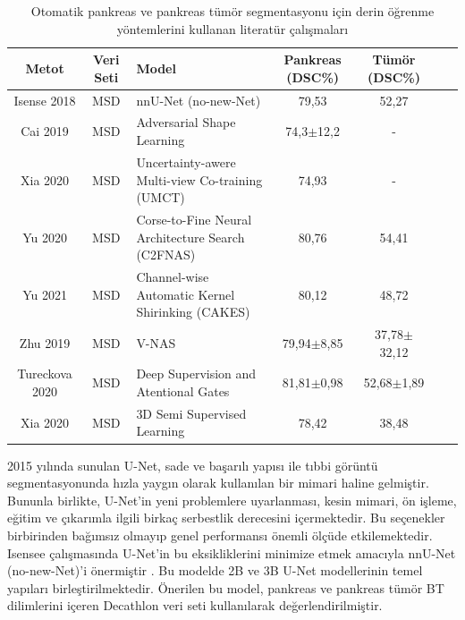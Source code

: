 \begin{table}[h!]
	\centering
	\caption{Otomatik pankreas ve pankreas tümör segmentasyonu için derin öğrenme yöntemlerini kullanan literatür çalışmaları}
	\label{tab:lit2}
	\begin{adjustbox}{width=\textwidth}
	\begin{tabular}{ccm{5cm}cccc}
		\toprule
		Metot                           &  Veri Seti   &  Model  & Pankreas (DSC\%)  & Tümör (DSC\%) \\ 
		\midrule 
		Isense 2018 \cite{isensee2018nnu}  &  MSD    &  nnU-Net (no-new-Net)  & 79,53 & 52,27  \\ 
		Cai 2019 \cite{cai2019end}  &  MSD   &  Adversarial Shape Learning & 74,3$\pm$12,2 & - \\
		Xia 2020 \cite{xia2020uncertainty}    &  MSD    &  Uncertainty-awere Multi-view Co-training (UMCT)   & 74,93 & - \\
		Yu 2020 \cite{yu2020c2fnas}    &  MSD    & Corse-to-Fine Neural Architecture Search (C2FNAS)   & 80,76 & 54,41\\
		Yu 2021 \cite{yu2020cakes}    &  MSD    & Channel-wise Automatic Kernel Shirinking (CAKES) & 80,12 & 48,72\\
		Zhu 2019 \cite{zhu2019v}     &  MSD    &  V-NAS & 79,94$\pm$8,85 & 37,78$\pm$32,12 \\
		Tureckova 2020 \cite{tureckova2020improving}      &  MSD    &  Deep Supervision and Atentional Gates      & 81,81$\pm$0,98 & 52,68$\pm$1,89 \\
		Xia 2020       \cite{xia20203d}      &  MSD    &  3D Semi Supervised Learning                      & 78,42 & 38,48 \\
		\bottomrule
	\end{tabular}
	\end{adjustbox}
\end{table}

2015 yılında sunulan U-Net, sade ve başarılı yapısı ile tıbbi görüntü segmentasyonunda hızla yaygın olarak kullanılan bir mimari haline gelmiştir. Bununla birlikte, U-Net'in yeni problemlere uyarlanması, kesin mimari, ön işleme, eğitim ve çıkarımla ilgili birkaç serbestlik derecesini içermektedir. Bu seçenekler birbirinden bağımsız olmayıp genel performansı önemli ölçüde etkilemektedir. Isensee çalışmasında U-Net’in bu eksikliklerini minimize etmek amacıyla nnU-Net (no-new-Net)’i önermiştir \cite{isensee2018nnu}. Bu modelde 2B ve 3B U-Net modellerinin temel yapıları birleştirilmektedir. Önerilen bu model, pankreas ve pankreas tümör BT dilimlerini içeren Decathlon veri seti kullanılarak değerlendirilmiştir. 

